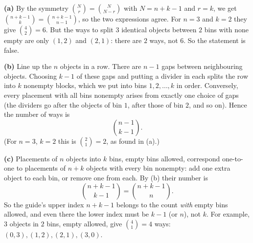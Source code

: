 \textbf{(a)} By the symmetry $\binom Nr=\binom N{N-r}$ with $N=n+k-1$ and $r=k$, we get $\binom{n+k-1}{k}=\binom{n+k-1}{n-1}$, so the two expressions agree. For $n=3$ and $k=2$ they give $\binom42=6$. But the ways to split $3$ identical objects between $2$ bins with none empty are only $(1,2)$ and $(2,1)$: there are $2$ ways, not $6$. So the statement is false.

\textbf{(b)} Line up the $n$ objects in a row. There are $n-1$ gaps between neighbouring objects. Choosing $k-1$ of these gaps and putting a divider in each splits the row into $k$ nonempty blocks, which we put into bins $1,2,\dots,k$ in order. Conversely, every placement with all bins nonempty arises from exactly one choice of gaps (the dividers go after the objects of bin $1$, after those of bin $2$, and so on). Hence the number of ways is
\[\boxed{\binom{n-1}{k-1}}.\]
(For $n=3$, $k=2$ this is $\binom21=2$, as found in (a).)

\textbf{(c)} Placements of $n$ objects into $k$ bins, empty bins allowed, correspond one-to-one to placements of $n+k$ objects with every bin nonempty: add one extra object to each bin, or remove one from each. By (b) their number is
\[\binom{n+k-1}{k-1}=\binom{n+k-1}{n}.\]
So the guide's upper index $n+k-1$ belongs to the count \emph{with} empty bins allowed, and even there the lower index must be $k-1$ (or $n$), not $k$. For example, $3$ objects in $2$ bins, empty allowed, give $\binom41=4$ ways: $(0,3),(1,2),(2,1),(3,0)$.
